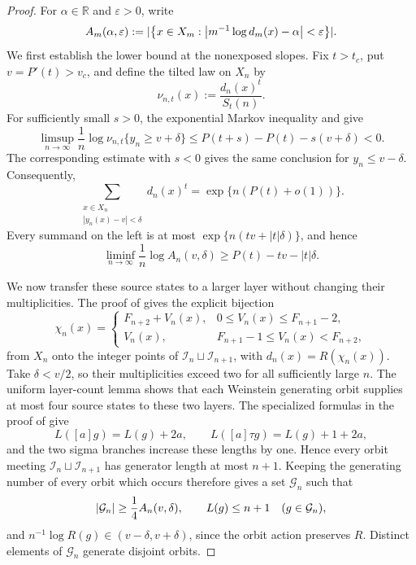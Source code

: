 \begin{proof}
For \(\alpha\in\mathbb R\) and \(\varepsilon>0\), write
\[
 A_m(\alpha,\varepsilon)
 :=\lvert \left\{x\in X_m:
 \left|m^{-1}\log d_m(x)-\alpha\right|<\varepsilon\right\} \rvert.
\]
We first establish the lower bound at the nonexposed slopes.  Fix
\(t>t_c\), put \(v=P'(t)>v_c\), and define the tilted law on \(X_n\) by
\[
 \nu_{n,t}(x):=\frac{d_n(x)^t}{S_t(n)}.
\]
For sufficiently small \(s>0\), the exponential Markov inequality and
 give
\[
 \limsup_{n\to\infty}\frac1n
 \log\nu_{n,t}\{y_n\ge v+\delta\}
 \le P(t+s)-P(t)-s(v+\delta)<0.
\]
The corresponding estimate with \(s<0\) gives the same conclusion for
\(y_n\le v-\delta\).  Consequently,
\[
 \sum_{\substack{x\in X_n\\|y_n(x)-v|<\delta}}d_n(x)^t
 =\exp\{n(P(t)+o(1))\}.
\]
Every summand on the left is at most
\(\exp\{n(tv+|t|\delta)\}\), and hence
\begin{equation}
 \liminf_{n\to\infty}\frac1n\log A_n(v,\delta)
 \ge P(t)-tv-|t|\delta.
 \label{eq:exposed-source-count}
\end{equation}

We now transfer these source states to a larger layer without changing their
multiplicities.  The proof of  gives the
explicit bijection
\[
 \chi_n(x)=
 \begin{cases}
  F_{n+2}+V_n(x),&0\le V_n(x)\le F_{n+1}-2,\\
  V_n(x),&F_{n+1}-1\le V_n(x)<F_{n+2},
 \end{cases}
\]
from \(X_n\) onto the integer points of
\(\mathcal I_n\sqcup\mathcal I_{n+1}\), with
\(d_n(x)=R(\chi_n(x))\).  Take
\(\delta<v/2\), so their multiplicities exceed two for all sufficiently
large \(n\).  The uniform layer-count lemma shows that each Weinstein
generating orbit supplies at most four source states to these two layers.
The specialized formulas in the proof of
 give
\[
 L([a]g)=L(g)+2a,\qquad
 L([a]\tau g)=L(g)+1+2a,
\]
and the two sigma branches increase these lengths by one.  Hence every orbit
meeting \(\mathcal I_n\sqcup\mathcal I_{n+1}\) has generator length at most
\(n+1\).
Keeping the generating number of every orbit which occurs therefore gives a
set \(\mathcal G_n\) such that
\begin{equation}
 \lvert \mathcal G_n \rvert\ge\frac14 A_n(v,\delta),
 \qquad L(g)\le n+1\quad(g\in\mathcal G_n),
 \label{eq:source-generating-orbits}
\end{equation}
and \(n^{-1}\log R(g)\in(v-\delta,v+\delta)\), since the orbit action
preserves \(R\).  Distinct elements of
\(\mathcal G_n\) generate disjoint orbits.


\end{proof}
